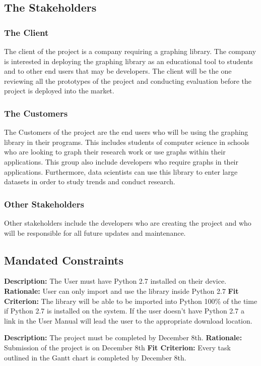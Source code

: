 \documentclass[12pt, titlepage]{article}
\begin{document}
\subsection{The Stakeholders}

\subsubsection{The Client}
The client of the project is a company requiring a graphing library. The company is interested in deploying the graphing library as an educational tool to students and to other end users that may be developers. The client will be the one reviewing all the prototypes of the project and conducting evaluation before the project is deployed into the market.
\subsubsection{The Customers}
The Customers of the project are the end users who will be using the graphing library in their programs. This includes students of computer science in schools who are looking to graph their research work or use graphs within their applications. This group also include developers who require graphs in their applications. Furthermore, data scientists can use this library to enter large datasets in order to study trends and conduct research.
\subsubsection{Other Stakeholders}
Other stakeholders include the developers who are creating the project and who will be responsible for all future updates and maintenance.
\subsection{Mandated Constraints}
\textbf{Description:} The User must have Python 2.7 installed on their device.
\textbf{Rationale:} User can only import and use the library inside Python 2.7
\textbf{Fit Criterion:} The library will be able to be imported into Python 100\% of the time if Python 2.7 is installed on the system. If the user doesn't have Python 2.7 a link in the User Manual will lead 	the user to the appropriate download location.

\textbf{Description:} The project must be completed by December 8th. 
\textbf{Rationale:} Submission of the project is on December 8th
\textbf{Fit Criterion:} Every task outlined in the Gantt chart is completed by December 8th.
\end{document}
